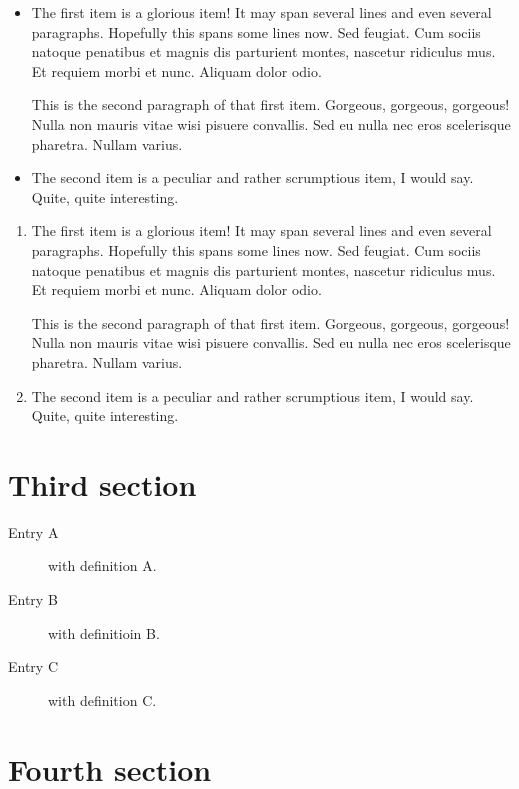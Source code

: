 \documentclass[final,11pt,baselinegrid]{../../uit-thesis}
\begin{document}
\begin{itemize}
\item The first item is a glorious item! It may span several lines and even several paragraphs. Hopefully this spans some lines
now. Sed feugiat. Cum sociis natoque penatibus et magnis dis parturient montes, nascetur ridiculus mus. Et requiem morbi et nunc. Aliquam dolor odio.

This is the second paragraph of that first item. Gorgeous, gorgeous, gorgeous! Nulla non mauris vitae wisi pisuere convallis. Sed eu nulla nec eros scelerisque pharetra. Nullam varius.
\item The second item is a peculiar and rather scrumptious item, I would say. Quite, quite interesting.
\end{itemize}

\lipsum[7]

\begin{enumerate}
\item The first item is a glorious item! It may span several lines and even several paragraphs. Hopefully this spans some lines
now. Sed feugiat. Cum sociis natoque penatibus et magnis dis parturient montes, nascetur ridiculus mus. Et requiem morbi et nunc. Aliquam dolor odio.

This is the second paragraph of that first item. Gorgeous, gorgeous, gorgeous! Nulla non mauris vitae wisi pisuere convallis. Sed eu nulla nec eros scelerisque pharetra. Nullam varius.
\item The second item is a peculiar and rather scrumptious item, I would say. Quite, quite interesting.
\end{enumerate}

\newpage

\section{Third section}
\lipsum[6-8]

\begin{description}
\item[Entry A] with definition A.
\item[Entry B] with definitioin B.
\item[Entry C] with definition C.
\end{description}

\section{Fourth section}
\lipsum[6-7]
\end{document}
